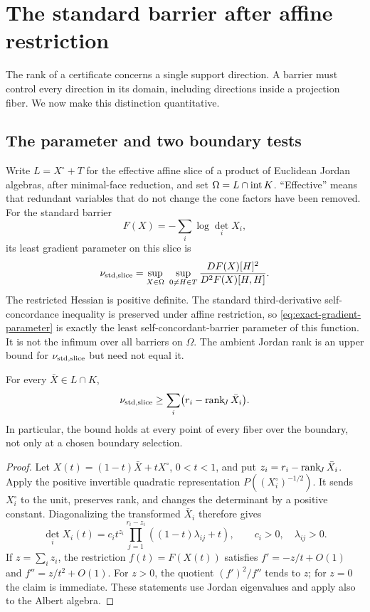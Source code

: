 \section{The standard barrier after affine restriction}\label{sec:restricted}
The rank of a certificate concerns a single support direction. A barrier
must control every direction in its domain, including directions inside a
projection fiber. We now make this distinction quantitative.

\subsection{The parameter and two boundary tests}
Write $L=X^\circ+T$ for the effective affine slice of a product of
Euclidean Jordan algebras, after minimal-face reduction, and set
$\Omega=L\cap\operatorname{int} K$. ``Effective'' means that redundant variables
that do not change the cone factors have been removed. For the standard
barrier
\[
 F(X)=-\sum_i\log\det_i X_i,
\]
its least gradient parameter on this slice is
\begin{equation}\label{eq:exact-gradient-parameter}
 \nu_{\mathrm{std},\mathrm{slice}}=\sup_{X\in\Omega}\ \sup_{0\ne H\in T}
 \frac{DF(X)[H]^2}{D^2F(X)[H,H]}.
\end{equation}
The restricted Hessian is positive definite. The standard third-derivative
self-concordance inequality is preserved under affine restriction, so
\eqref{eq:exact-gradient-parameter} is exactly the least
self-concordant-barrier parameter of this function. It is not
the infimum over all barriers on $\Omega$. The ambient Jordan rank is an
upper bound for $\nu_{\mathrm{std},\mathrm{slice}}$ but need not equal it.

\begin{lemma}\label{lem:boundary-order}
For every $\bar X\in L\cap K$,
\begin{equation}\label{eq:nullity-barrier}
 \nu_{\mathrm{std},\mathrm{slice}}\geq\sum_i\bigl(r_i-\operatorname{rank}_{\!J}\bar X_i\bigr).
\end{equation}
In particular, the bound holds at every point of every fiber over the
boundary, not only at a chosen boundary selection.
\end{lemma}
\begin{proof}
Let $X(t)=(1-t)\bar X+tX^\circ$, $0<t<1$, and put
$z_i=r_i-\operatorname{rank}_{\!J}\bar X_i$. Apply the positive invertible quadratic
representation $P((X_i^\circ)^{-1/2})$. It sends $X_i^\circ$ to the unit,
preserves rank, and changes the determinant by a positive constant.
Diagonalizing the transformed $\bar X_i$ therefore gives
\[
 \det_i X_i(t)=c_i t^{z_i}\prod_{j=1}^{r_i-z_i}
 ((1-t)\lambda_{ij}+t),\qquad c_i>0,\quad\lambda_{ij}>0.
\]
If $z=\sum_i z_i$, the restriction $f(t)=F(X(t))$ satisfies
$f'=-z/t+O(1)$ and $f''=z/t^2+O(1)$. For $z>0$, the quotient
$(f')^2/f''$ tends to $z$; for $z=0$ the claim is immediate.
These statements use Jordan eigenvalues and apply also to the Albert
algebra.
\end{proof}

